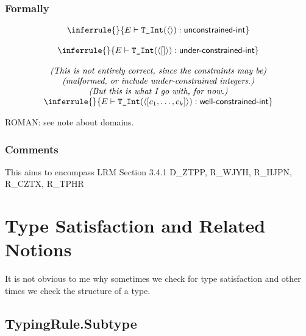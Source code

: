 \documentclass{book}
\newcommand\RuleComment[1]{\textit{(#1)}}
\newcommand\isunconstrainedinteger[0]{\textsf{unconstrained-int}}
\newcommand\isunderconstrainedinteger[0]{\textsf{under-constrained-int}}
\newcommand\iswellconstrainedinteger[0]{\textsf{well-constrained-int}}
\newcommand\unconstrainedinteger[0]{\TInt(\langle\rangle)}
\begin{document}
\begin{emptyformal}
    \subsection{Formally}

\[
\begin{array}{c}
\inferrule{}{E \entails \unconstrainedinteger : \isunconstrainedinteger}\\
\\
\inferrule{}{E \entails \TInt(\langle [] \rangle) : \isunderconstrainedinteger}\\
\\
\RuleComment{This is not entirely correct, since the constraints may be}\\
\RuleComment{malformed, or include under-constrained integers.}\\
\RuleComment{But this is what I go with, for now.}\\
\inferrule{}{E \entails \TInt(\langle [c_1,\ldots,c_k]\rangle) : \iswellconstrainedinteger}
\end{array}
\]     
    
\begin{emptytodo}
ROMAN: see note about domains.
\end{emptytodo}
\end{emptyformal}

\subsection{Comments}
    This aims to encompass LRM Section 3.4.1 D\_ZTPP, R\_WJYH, R\_HJPN, R\_CZTX, R\_TPHR

\chapter{Type Satisfaction and Related Notions}

\begin{emptytodo}
It is not obvious to me why sometimes we check for type satisfaction and other times we check the structure of a type.
\end{emptytodo}

\section{TypingRule.Subtype}
\end{document}
